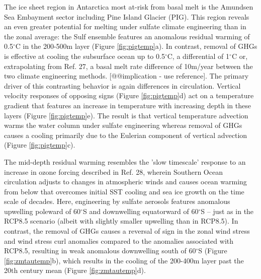 \documentclass{nature}
\begin{document}
The ice sheet region in Antarctica most at-risk from basal melt is the Amundsen Sea Embayment sector including Pine Island Glacier (PIG). This region reveals an even greater potential for melting under sulfate climate engineering than in the zonal average: the Sulf ensemble features an anomalous residual warming of 0.5$^\circ$C in the 200-500m layer (Figure \ref{fig:pigtemp}a). In contrast, removal of GHGs is effective at cooling the subsurface ocean up to 0.5$^\circ$C, a differential of 1$^\circ$C or, extrapolating from Ref. 27, a basal melt rate difference of 10m/year between the two climate engineering methods. [@@implication - use reference]. The primary driver of this contrasting behavior is again differences in circulation. Vertical velocity responses of opposing signs (Figure \ref{fig:pigtemp}d) act on a temperature gradient that features an increase in temperature with increasing depth in these layers (Figure \ref{fig:pigtemp}e). The result is that vertical temperature advection warms the water column under sulfate engineering whereas removal of GHGs causes a cooling primarily due to the Eulerian component of vertical advection (Figure \ref{fig:pigtemp}c). %

The mid-depth residual warming resembles the 'slow timescale' response to an increase in ozone forcing described in Ref. 28, wherein Southern Ocean circulation adjusts to changes in atmospheric winds and causes ocean warming from below that overcomes initial SST cooling and sea ice growth on the time scale of decades. Here, engineering by sulfate aerosols features anomalous upwelling poleward of 60$^\circ$S and downwelling equatorward of 60$^\circ$S -- just as in the RCP8.5 scenario (albeit with slightly smaller upwelling than in RCP8.5). In contrast, the removal of GHGs causes a reversal of sign in the zonal wind stress and wind stress curl anomalies compared to the anomalies associated with RCP8.5, resulting in weak anomalous downwelling south of 60$^\circ$S (Figure \ref{fig:zmtautemp}b), which results in the cooling of the 200-400m layer past the 20th century mean (Figure \ref{fig:zmtautemp}d). 
\end{document}
